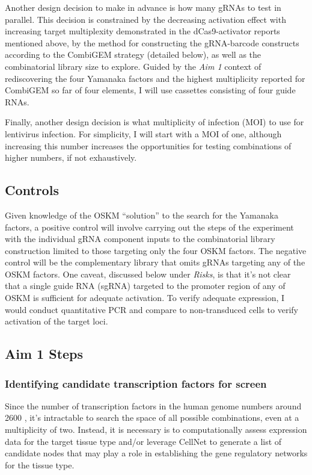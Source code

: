 \documentclass[10pt]{article}
\begin{document}
Another design decision to make in advance is how many gRNAs to test in parallel. This decision is constrained by the decreasing activation effect with increasing target multiplexity demonstrated in the dCas9-activator reports mentioned above, by the method for constructing the gRNA-barcode constructs according to the CombiGEM \cite{cheng2014enhanced} strategy (detailed below), as well as the combinatorial library size to explore. Guided by the \textit{Aim 1} context of rediscovering the four Yamanaka factors and the highest multiplicity reported for CombiGEM so far of four elements, I will use cassettes consisting of four guide RNAs.

Finally, another design decision is what multiplicity of infection (MOI) to use for lentivirus infection. For simplicity, I will start with a MOI of one, although increasing this number increases the opportunities for testing combinations of higher numbers, if not exhaustively.

\subsection{Controls}

Given knowledge of the OSKM ``solution'' to the search for the Yamanaka factors, a positive control will involve carrying out the steps of the experiment with the individual gRNA component inputs to the combinatorial library construction limited to those targeting only the four OSKM factors. The negative control will be the complementary library that omits gRNAs targeting any of the OSKM factors. One caveat, discussed below under \textit{Risks}, is that it's not clear that a single guide RNA (sgRNA) targeted to the promoter region of any of OSKM is sufficient for adequate activation. To verify adequate expression, I would conduct quantitative PCR and compare to non-transduced cells to verify activation of the target loci.

\subsection{Aim 1 Steps}

\subsubsection{Identifying candidate transcription factors for screen}

Since the number of transcription factors in the human genome numbers around 2600 \cite{babu2004structure}, it's intractable to search the space of all possible combinations, even at a multiplicity of two. Instead, it is necessary is to computationally assess expression data for the target tissue type and/or leverage CellNet \cite{cahan2014cellnet} to generate a list of candidate nodes that may play a role in establishing the gene regulatory networks for the tissue type.
\end{document}
